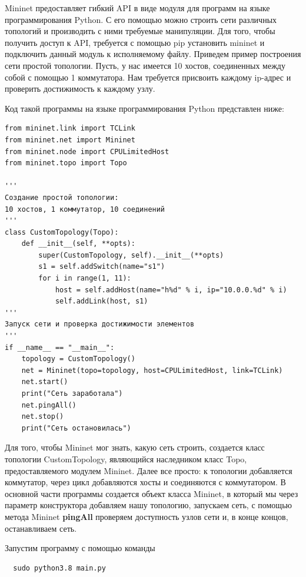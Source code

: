 Mininet предоставляет гибкий API \cite{mininet_api} в виде модуля
для программ на языке программирования Python. С его помощью можно
строить сети различных топологий и производить с ними требуемые
манипуляции. Для того, чтобы получить доступ к API, требуется с помощью
pip \cite{pip} установить mininet и подключить данный модуль к
исполняемому файлу. Приведем пример построения сети простой топологии.
Пусть, у нас имеется 10 хостов, соединенных между собой с помощью 1
коммутатора. Нам требуется присвоить каждому ip-адрес и проверить
достижимость к каждому узлу.

Код такой программы на языке программирования Python представлен ниже:

\begin{verbatim}
from mininet.link import TCLink
from mininet.net import Mininet
from mininet.node import CPULimitedHost
from mininet.topo import Topo

'''
Создание простой топологии:
10 хостов, 1 коммутатор, 10 соединений
'''
class CustomTopology(Topo):
    def __init__(self, **opts):
        super(CustomTopology, self).__init__(**opts)
        s1 = self.addSwitch(name="s1")
        for i in range(1, 11):
            host = self.addHost(name="h%d" % i, ip="10.0.0.%d" % i)
            self.addLink(host, s1)
'''
Запуск сети и проверка достижимости элементов
'''
if __name__ == "__main__":
    topology = CustomTopology()
    net = Mininet(topo=topology, host=CPULimitedHost, link=TCLink)
    net.start()
    print("Сеть заработала")
    net.pingAll()
    net.stop()
    print("Сеть остановилась")
\end{verbatim}

Для того, чтобы Mininet мог знать, какую сеть строить, создается класс
топологии CustomTopology, являющийся наследником класс Topo,
предоставляемого модулем Mininet. Далее все просто: к топологии
добавляется коммутатор, через цикл добавляются хосты и соединяются с
коммутатором. В основной части программы создается объект класса
Mininet, в который мы через параметр конструктора добавляем нашу
топологию, запускаем сеть, с помощью метода Mininet \textbf{pingAll}
проверяем доступность узлов сети и, в конце концов, останавливаем сеть.

Запустим программу с помощью команды

\begin{verbatim}
  sudo python3.8 main.py 
\end{verbatim}

